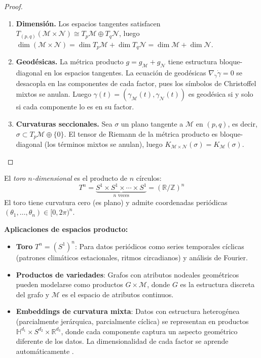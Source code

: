 \begin{proof}
\leavevmode
\begin{enumerate}
    \item \textbf{Dimensión.} Los espacios tangentes satisfacen $T_{(p,q)}(\mathcal{M} \times \mathcal{N}) \cong T_p\mathcal{M} \oplus T_q\mathcal{N}$, luego $\dim(\mathcal{M} \times \mathcal{N}) = \dim T_p\mathcal{M} + \dim T_q\mathcal{N} = \dim \mathcal{M} + \dim \mathcal{N}$.

    \item \textbf{Geodésicas.} La métrica producto $g = g_\mathcal{M} + g_\mathcal{N}$ tiene estructura bloque-diagonal en los espacios tangentes. La ecuación de geodésicas $\nabla_{\dot\gamma}\dot\gamma = 0$ se desacopla en las componentes de cada factor, pues los símbolos de Christoffel mixtos se anulan. Luego $\gamma(t) = (\gamma_\mathcal{M}(t), \gamma_\mathcal{N}(t))$ es geodésica si y solo si cada componente lo es en su factor.

    \item \textbf{Curvaturas seccionales.} Sea $\sigma$ un plano tangente a $\mathcal{M}$ en $(p,q)$, es decir, $\sigma \subset T_p\mathcal{M} \oplus \{0\}$. El tensor de Riemann de la métrica producto es bloque-diagonal (los términos mixtos se anulan), luego $K_{\mathcal{M}\times\mathcal{N}}(\sigma) = K_\mathcal{M}(\sigma)$. \qedhere
\end{enumerate}
\end{proof}

\begin{definition}\label{def:toro_n}
El \textit{toro $n$-dimensional} es el producto de $n$ círculos:
\[
T^n = \underbrace{S^1 \times S^1 \times \cdots \times S^1}_{n \text{ veces}} = (\mathbb{R}/\mathbb{Z})^n
\]
El toro tiene curvatura cero (es plano) y admite coordenadas periódicas $(\theta_1, \ldots, \theta_n) \in [0, 2\pi)^n$.
\end{definition}

\textbf{Aplicaciones de espacios producto:}

\begin{itemize}
    \item \textbf{Toro} $T^n = (S^1)^n$: Para datos periódicos como series temporales cíclicas (patrones climáticos estacionales, ritmos circadianos) y análisis de Fourier.

    \item \textbf{Productos de variedades}: Grafos con atributos nodeales geométricos pueden modelarse como productos $G \times \mathcal{M}$, donde $G$ es la estructura discreta del grafo y $\mathcal{M}$ es el espacio de atributos continuos.

    \item \textbf{Embeddings de curvatura mixta}: Datos con estructura heterogénea (parcialmente jerárquica, parcialmente cíclica) se representan en productos $\mathbb{H}^{d_1} \times S^{d_2} \times \mathbb{R}^{d_3}$, donde cada componente captura un aspecto geométrico diferente de los datos. La dimensionalidad de cada factor se aprende automáticamente \citep{bronstein2017geometricdeeplearning}.
\end{itemize}

